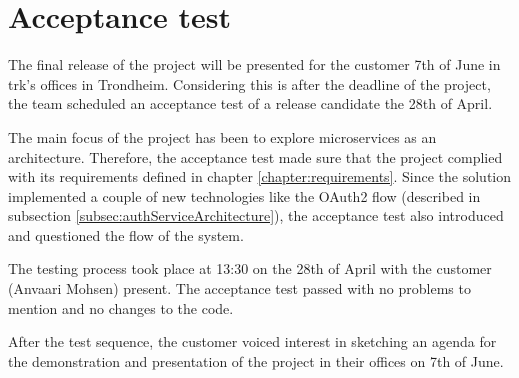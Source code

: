 \section{Acceptance test} \label{section:acceptanceTest}

The final release of the project will be presented for the customer 7th of June in \acrshort{trk}'s offices in Trondheim. Considering this is after the deadline of the project, the team scheduled an acceptance test of a release candidate the 28th of April. 

The main focus of the project has been to explore microservices as an architecture. Therefore, the acceptance test made sure that the project complied with its requirements defined in chapter \ref{chapter:requirements}. Since the solution implemented a couple of new technologies like the OAuth2 flow (described in subsection \ref{subsec:authServiceArchitecture}), the acceptance test also introduced and questioned the flow of the system.

The testing process took place at 13:30 on the 28th of April with the customer (Anvaari Mohsen) present. The acceptance test passed with no problems to mention and no changes to the code. 

After the test sequence, the customer voiced interest in sketching an agenda for the demonstration and presentation of the project in their offices on 7th of June.
